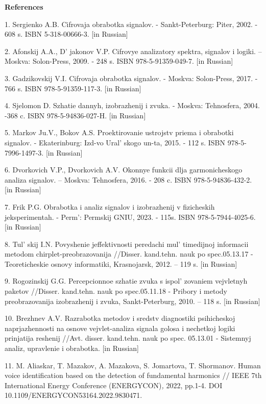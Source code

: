 \begin{center}
{\bfseries References}
\end{center}

\begin{references}
1. Sergienko A.B. Cifrovaja obrabotka signalov. - Sankt-Peterburg: Piter,
2002. - 608 s. ISBN 5-318-00666-3. {[}in Russian{]}

2. Afonskij A.A., D' jakonov V.P. Cifrovye analizatory
spektra, signalov i logiki. -- Moskva: Solon-Press, 2009. - 248 s. ISBN
978-5-91359-049-7. {[}in Russian{]}

3. Gadzikovskij V.I. Cifrovaja obrabotka signalov. - Moskva: Solon-Press,
2017. - 766 s. ISBN 978-5-91359-117-3. {[}in Russian{]}

4. Sjelomon D. Szhatie dannyh, izobrazhenij i zvuka. - Moskva:
Tehnosfera, 2004. -368 c. ISBN 978-5-94836-027-H. {[}in Russian{]}

5. Markov Ju.V., Bokov A.S. Proektirovanie ustrojstv priema i obrabotki
signalov. - Ekaterinburg: Izd-vo Ural' skogo un-ta, 2015.
- 112 s. ISBN 978-5-7996-1497-3. {[}in Russian{]}

6. Dvorkovich V.P., Dvorkovich A.V. Okonnye funkcii dlja garmonicheskogo
analiza signalov. -- Moskva: Tehnosfera, 2016. - 208 c. ISBN
978-5-94836-432-2. {[}in Russian{]}

7. Frik P.G. Obrabotka i analiz signalov i izobrazhenij v fizicheskih
jeksperimentah. - Perm': Permskij GNIU, 2023. - 115s.
ISBN 978-5-7944-4025-6. {[}in Russian{]}

8. Tul' skij I.N. Povyshenie jeffektivnosti peredachi
mul' timedijnoj informacii metodom
chirplet-preobrazovanija //Disser. kand.tehn. nauk po spec.05.13.17 -
Teoreticheskie osnovy informatiki, Krasnojarsk, 2012. -- 119 s. {[}in
Russian{]}

9. Rogozinskij G.G. Percepcionnoe szhatie zvuka s
ispol' zovaniem vejvletnyh paketov //Disser. kand.tehn.
nauk po spec.05.11.18 - Pribory i metody preobrazovanija izobrazhenij i
zvuka, Sankt-Peterburg, 2010. -- 118 s. {[}in Russian{]}

10. Brezhnev A.V. Razrabotka metodov i sredstv diagnostiki psihicheskoj
naprjazhennosti na osnove vejvlet-analiza signala golosa i nechetkoj
logiki prinjatija reshenij //Avt. disser. kand.tehn. nauk po spec.
05.13.01 - Sistemnyj analiz, upravlenie i obrabotka. {[}in Russian{]}

11. M. Aliaskar, T. Mazakov, A. Mazakova, S. Jomartova, T. Shormanov.
Human voice identification based on the detection of fundamental
harmonics // IEEE 7th International Energy Conference
(ENERGYCON)\emph{,} 2022, pp.1-4. DOI
10.1109/ENERGYCON53164.2022.9830471.


\end{references}

